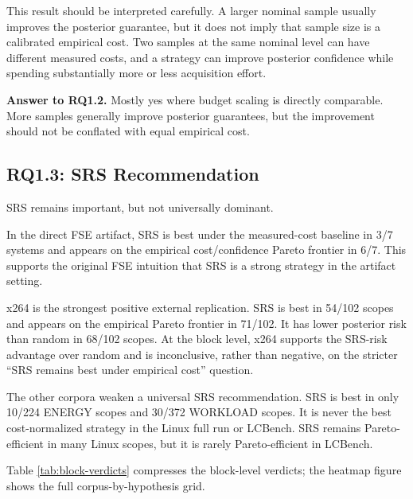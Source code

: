 \documentclass[smallcondensed]{svjour3}
\begin{document}
This result should be interpreted carefully. A larger nominal sample
usually improves the posterior guarantee, but it does not imply that
sample size is a calibrated empirical cost. Two samples at the same
nominal level can have different measured costs, and a strategy can
improve posterior confidence while spending substantially more or less
acquisition effort.

\textbf{Answer to RQ1.2.} Mostly yes where budget scaling is directly
comparable. More samples generally improve posterior guarantees, but the
improvement should not be conflated with equal empirical cost.

\subsection{RQ1.3: SRS Recommendation}\label{rq1.3-srs-recommendation}

SRS remains important, but not universally dominant.

In the direct FSE artifact, SRS is best under the measured-cost baseline
in 3/7 systems and appears on the empirical cost/confidence Pareto
frontier in 6/7. This supports the original FSE intuition that SRS is a
strong strategy in the artifact setting.

x264 is the strongest positive external replication. SRS is best in
54/102 scopes and appears on the empirical Pareto frontier in 71/102. It
has lower posterior risk than random in 68/102 scopes. At the block
level, x264 supports the SRS-risk advantage over random and is
inconclusive, rather than negative, on the stricter ``SRS remains best
under empirical cost'' question.

The other corpora weaken a universal SRS recommendation. SRS is best in
only 10/224 ENERGY scopes and 30/372 WORKLOAD scopes. It is never the
best cost-normalized strategy in the Linux full run or LCBench. SRS
remains Pareto-efficient in many Linux scopes, but it is rarely
Pareto-efficient in LCBench.

Table \ref{tab:block-verdicts} compresses the block-level verdicts; the
heatmap figure shows the full corpus-by-hypothesis grid.
\end{document}
